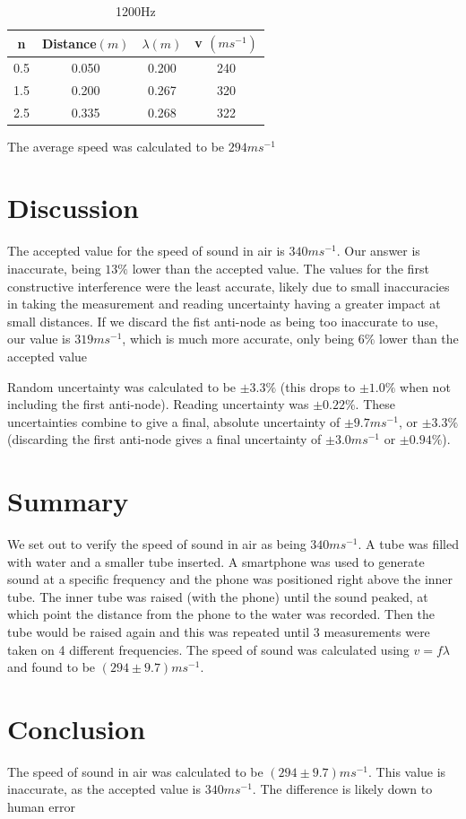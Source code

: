 \documentclass{article}
\begin{document}
\begin{table}[H]
    \centering
    \begin{tabular}{|c|c|c|c|}
    \hline
        n & Distance$(m)$ & $\lambda (m)$ & v $(ms^{-1})$ \\
        \hline \hline
        0.5 & 0.050 & 0.200 & 240\\ \hline
        1.5 & 0.200 & 0.267 & 320\\ \hline
        2.5 & 0.335 & 0.268 & 322\\ \hline
    \end{tabular}
    \caption{1200Hz}
    \label{tab:1200Hz}
\end{table}

The average speed was calculated to be $294ms^{-1}$

\section{Discussion}

The accepted value for the speed of sound in air is $340ms^{-1}$. Our answer is inaccurate, being $13\%$ lower than the accepted value. The values for the first constructive interference were the least accurate, likely due to small inaccuracies in taking the measurement and reading uncertainty having a greater impact at small distances. If we discard the fist anti-node as being too inaccurate to use, our value is $319ms^{-1}$, which is much more accurate, only being $6\%$ lower than the accepted value

Random uncertainty was calculated to be $\pm 3.3\%$ (this drops to $\pm 1.0\%$ when not including the first anti-node). Reading uncertainty was $\pm 0.22\%$. These uncertainties combine to give a final, absolute uncertainty of $\pm 9.7ms^{-1}$, or $\pm 3.3\%$ (discarding the first anti-node gives a final uncertainty of $\pm 3.0ms^{-1}$ or $\pm 0.94\%$).

\section{Summary}

We set out to verify the speed of sound in air as being $340ms^{-1}$. A tube was filled with water and a smaller tube inserted. A smartphone was used to generate sound at a specific frequency and the phone was positioned right above the inner tube. The inner tube was raised (with the phone) until the sound peaked, at which point the distance from the phone to the water was recorded. Then the tube would be raised again and this was repeated until 3 measurements were taken on 4 different frequencies. The speed of sound was calculated using $v=f\lambda$ and found to be $(294\pm 9.7)ms^{-1}$.

\section{Conclusion}

The speed of sound in air was calculated to be $(294\pm 9.7)ms^{-1}$. This value is inaccurate, as the accepted value is $340ms^{-1}$. The difference is likely down to human error
\end{document}
